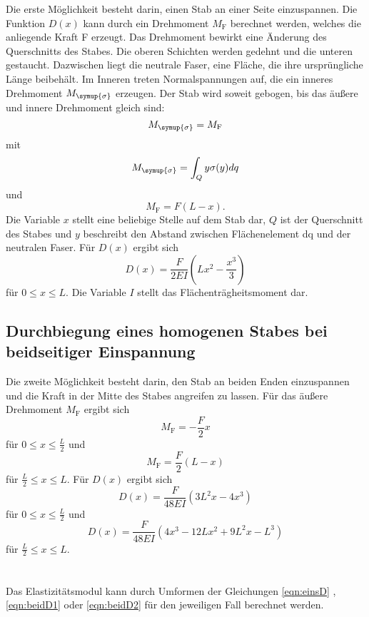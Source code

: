    Die erste Möglichkeit besteht darin, einen Stab an einer Seite einzuspannen.
    Die Funktion $D(x)$ kann durch ein Drehmoment $M_\text{F}$ berechnet werden, welches die anliegende Kraft F erzeugt.
    Das Drehmoment bewirkt eine Änderung des Querschnitts des Stabes. Die oberen Schichten werden gedehnt und die unteren
    gestaucht. Dazwischen liegt die neutrale Faser, eine Fläche, die ihre ursprüngliche Länge beibehält.
    Im Inneren treten Normalspannungen auf, die ein inneres Drehmoment $M_{\symup{\sigma}}$ erzeugen. 
    Der Stab wird soweit gebogen, bis das äußere und innere Drehmoment gleich sind: 
    \begin{equation}
        M_{\symup{\sigma}} = M_\text{F}
    \end{equation}
    mit 
    \begin{equation}
        M_{\symup{\sigma}} = \int_Q y\sigma(y) dq 
    \end{equation}
    und
    \begin{equation}
        M_\text{F} = F (L-x) .
    \end{equation}
    Die Variable $x$ stellt eine beliebige Stelle auf dem Stab dar, $Q$ ist der Querschnitt des Stabes und $y$ beschreibt den 
    Abstand zwischen Flächenelement dq und der neutralen Faser.
    Für $D(x)$ ergibt sich 
    \begin{equation}
        D(x) = \frac{F}{2EI} (Lx^2 - \frac{x^3}{3}) \label{eqn:einsD}
    \end{equation}
    für $0 \leq x \leq L$. Die Variable $I$ stellt das Flächenträgheitsmoment dar.

\subsection{Durchbiegung eines homogenen Stabes bei beidseitiger Einspannung} \label{sec:beidseitig}

    Die zweite Möglichkeit besteht darin, den Stab an beiden Enden einzuspannen und die Kraft in der 
    Mitte des Stabes angreifen zu lassen.
    Für das äußere Drehmoment $M_\text{F}$ ergibt sich 
    \begin{equation}
        M_\text{F} = - \frac{F}{2} x 
    \end{equation}
    für $0 \leq x \leq \frac{L}{2}$ und
    \begin{equation}
        M_\text{F} = \frac{F}{2} (L-x)
    \end{equation}
    für $\frac{L}{2} \leq x \leq L$.
    Für $D(x)$ ergibt sich 
    \begin{equation}
        D(x) = \frac{F}{48EI} (3L^2 x - 4x^3) \label{eqn:beidD1}
    \end{equation}
    für $0 \leq x \leq \frac{L}{2}$ und 
    \begin{equation}
        D(x) = \frac{F}{48EI} (4x^3 - 12Lx^2 + 9L^2 x - L^3) \label{eqn:beidD2}
    \end{equation}
    für $\frac{L}{2} \leq x \leq L$. \\ \\ \\

Das Elastizitätsmodul kann durch Umformen der Gleichungen \eqref{eqn:einsD} , \eqref{eqn:beidD1} oder \eqref{eqn:beidD2}
für den jeweiligen Fall berechnet werden.